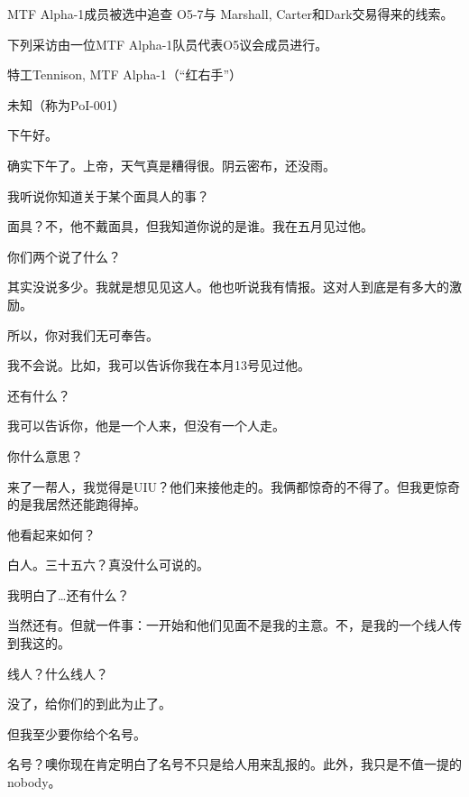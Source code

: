 MTF Alpha-1成员被选中追查 O5-7与 Marshall, Carter和Dark交易得来的线索。

\begin{scpbox}


下列采访由一位MTF Alpha-1队员代表O5议会成员进行。

特工Tennison, MTF Alpha-1（“红右手”）

未知（称为PoI-001）

\hr

下午好。

确实下午了。上帝，天气真是糟得很。阴云密布，还没雨。

我听说你知道关于某个面具人的事？

面具？不，他不戴面具，但我知道你说的是谁。我在五月见过他。

你们两个说了什么？

其实没说多少。我就是想见见这人。他也听说我有情报。这对人到底是有多大的激励。

所以，你对我们无可奉告。

我不会说。比如，我可以告诉你我在本月13号见过他。

\ii{{[}开始记笔记]}还有什么？

我可以告诉你，他是一个人来，但没有一个人走。

你什么意思？

来了一帮人，我觉得是UIU？他们来接他走的。我俩都惊奇的不得了。但我更惊奇的是我居然还能跑得掉。

他看起来如何？

白人。三十五六？真没什么可说的。

我明白了…还有什么？

当然还有。但就一件事：一开始和他们见面不是我的主意。不，是我的一个线人传到我这的。

线人？什么线人？

没了，给你们的到此为止了。

但我至少要你给个名号。

名号？噢你现在肯定明白了名号不只是给人用来乱报的。此外，我只是不值一提的nobody。

\end{scpbox}

